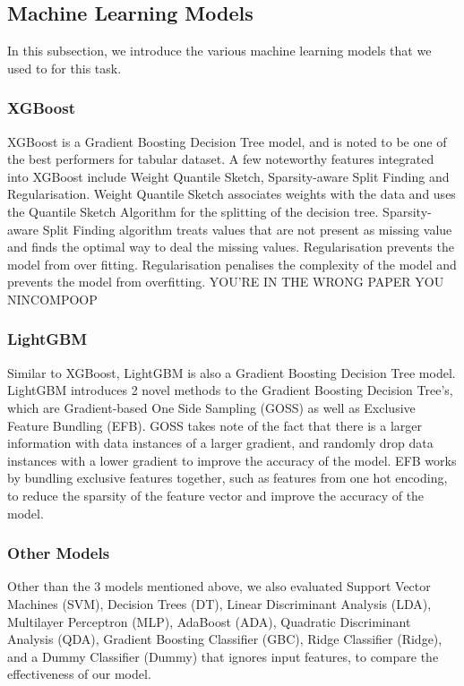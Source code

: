 \documentclass[runningheads]{llncs}
\begin{document}
\subsection{Machine Learning Models}
In this subsection, we introduce the various machine learning models that we used to for this task.
\subsubsection{XGBoost}
XGBoost is a Gradient Boosting Decision Tree model, and is noted to be one of the best performers for tabular dataset. A few noteworthy features integrated into XGBoost include Weight Quantile Sketch, Sparsity-aware Split Finding and Regularisation. Weight Quantile Sketch associates weights with the data and uses the Quantile Sketch Algorithm for the splitting of the decision tree. Sparsity-aware Split Finding algorithm treats values that are not present as missing value and finds the optimal way to deal the missing values. Regularisation prevents the model from over fitting. Regularisation penalises the complexity of the model and prevents the model from overfitting. YOU'RE IN THE WRONG PAPER YOU NINCOMPOOP
\subsubsection{LightGBM}
Similar to XGBoost, LightGBM is also a Gradient Boosting Decision Tree model. LightGBM introduces 2 novel methods to the Gradient Boosting Decision Tree's, which are Gradient-based One Side Sampling (GOSS) as well as Exclusive Feature Bundling (EFB). GOSS takes note of the fact that there is a larger information with data instances of a larger gradient, and randomly drop data instances with a lower gradient to improve the accuracy of the model. EFB works by bundling exclusive features together, such as features from one hot encoding, to reduce the sparsity of the feature vector and improve the accuracy of the model.

\subsubsection{Other Models} Other than the 3 models mentioned above, we also evaluated Support Vector Machines (SVM), Decision Trees (DT), Linear Discriminant Analysis (LDA), Multilayer Perceptron (MLP), AdaBoost (ADA), Quadratic Discriminant Analysis (QDA), Gradient Boosting Classifier (GBC), Ridge Classifier (Ridge), and a Dummy Classifier (Dummy) that ignores input features, to compare the effectiveness of our model. 
\end{document}
